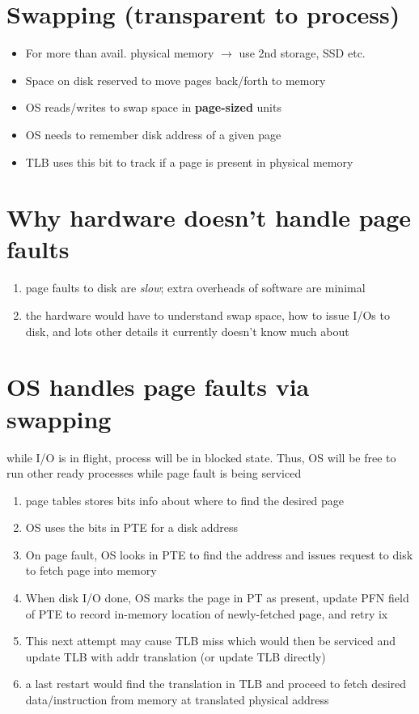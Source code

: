 \section*{Swapping (transparent to process)}
\begin{itemize}
\item For more than avail. physical memory $\to$ use 2nd storage, SSD etc.
\item Space on disk reserved to move pages back/forth to memory
\item OS reads/writes to swap space in \textbf{page-sized} units
\item OS needs to remember disk address of a given page
\item TLB uses this bit to track if a page is present in physical memory
\end{itemize}
\section*{Why hardware doesn't handle page faults}
\begin{enumerate}
\item page faults to disk are \emph{slow}; extra overheads of software are minimal
\item the hardware would have to understand swap space, how to issue I/Os to disk, and lots other details it currently doesn't know much about
\end{enumerate}
\section*{OS handles page faults via swapping}
while I/O is in flight, process will be in blocked state. Thus, OS will be free to run other ready processes while page fault is being serviced
\begin{enumerate}
\item page tables stores bits info about where to find the desired page
\item OS uses the bits in PTE for a disk address
\item On page fault, OS looks in PTE to find the address and issues request to disk to fetch page into memory
\item When disk I/O done, OS marks the page in PT as present, update PFN field of PTE to record in-memory location of newly-fetched page, and retry ix
\item This next attempt may cause TLB miss which would then be serviced and update TLB with addr translation (or update TLB directly)
\item a last restart would find the translation in TLB and proceed to fetch desired data/instruction from memory at translated physical address
\end{enumerate}
